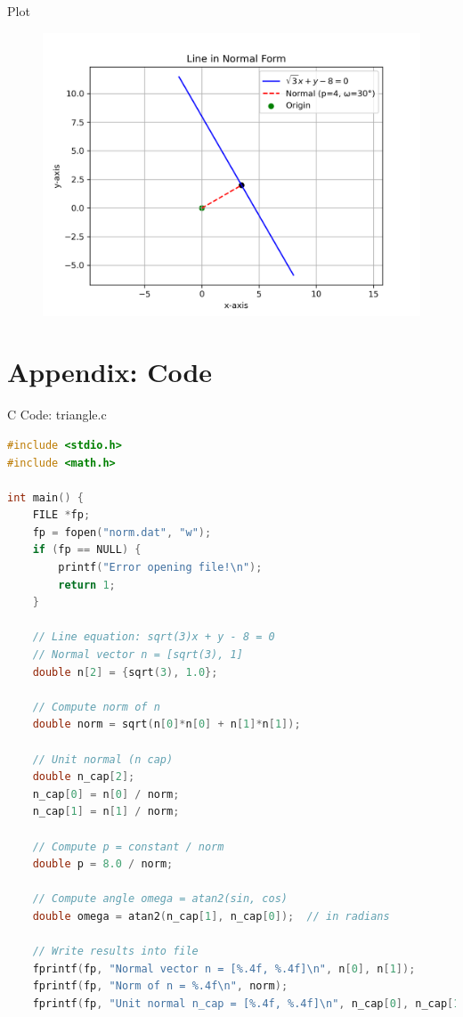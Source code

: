 \documentclass{beamer}
\numberwithin{equation}{section}
\theoremstyle{remark}
\begin{document}
\begin{frame}{Plot}
    \begin{figure}[H]
    \centering
    \includegraphics[width=0.9\columnwidth]{figs/01.png}
    \label{fig-1}
\end{figure}
\end{frame}
\section*{Appendix: Code}

\begin{frame}[fragile]{C Code: triangle.c}
\begin{lstlisting}[language=C]
#include <stdio.h>
#include <math.h>

int main() {
    FILE *fp;
    fp = fopen("norm.dat", "w");
    if (fp == NULL) {
        printf("Error opening file!\n");
        return 1;
    }

    // Line equation: sqrt(3)x + y - 8 = 0
    // Normal vector n = [sqrt(3), 1]
    double n[2] = {sqrt(3), 1.0};
    
    // Compute norm of n
    double norm = sqrt(n[0]*n[0] + n[1]*n[1]);

    // Unit normal (n cap)
    double n_cap[2];
    n_cap[0] = n[0] / norm;
    n_cap[1] = n[1] / norm;

    // Compute p = constant / norm
    double p = 8.0 / norm;

    // Compute angle omega = atan2(sin, cos)
    double omega = atan2(n_cap[1], n_cap[0]);  // in radians

    // Write results into file
    fprintf(fp, "Normal vector n = [%.4f, %.4f]\n", n[0], n[1]);
    fprintf(fp, "Norm of n = %.4f\n", norm);
    fprintf(fp, "Unit normal n_cap = [%.4f, %.4f]\n", n_cap[0], n_cap[1]);
   \end{lstlisting}
\end{frame}
\end{document}
